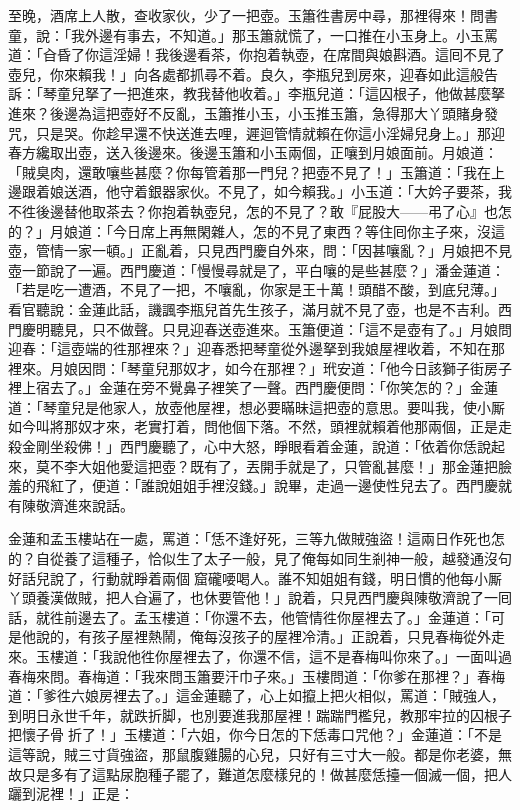 至晚，酒席上人散，查收家伙，少了一把壺。玉簫徃書房中尋，那裡得來！問書童，說：「我外邊有事去，不知道。」那玉簫就慌了，一口推在小玉身上。小玉罵道：「㒲昏了你這淫婦！我後邊看茶，你抱着執壺，在席間與娘斟酒。這囘不見了壺兒，你來賴我！」向各處都抓尋不着。良久，李瓶兒到房來，迎春如此這般告訴：「琴童兒拏了一把進來，教我替他收着。」李瓶兒道：「這囚根子，他做甚麼拏進來？後邊為這把壺好不反亂，玉簫推小玉，小玉推玉簫，急得那大丫頭賭身發咒，只是哭。你趁早還不快送進去哩，遲迴管情就賴在你這小淫婦兒身上。」那迎春方纔取出壺，送入後邊來。後邊玉簫和小玉兩個，正嚷到月娘面前。月娘道：「賊臭肉，還敢嚷些甚麼？你每管着那一門兒？把壺不見了！」玉簫道：「我在上邊跟着娘送酒，他守着銀器家伙。不見了，如今賴我。」小玉道：「大妗子要茶，我不徃後邊替他取茶去？你抱着執壺兒，怎的不見了？敢『屁股大——弔了心』也怎的？」月娘道：「今日席上再無閑雜人，怎的不見了東西？等住囘你主子來，沒這壺，管情一家一頓。」正亂着，只見西門慶自外來，問：「因甚嚷亂？」月娘把不見壺一節說了一遍。西門慶道：「慢慢尋就是了，平白嚷的是些甚麼？」潘金蓮道：「若是吃一遭酒，不見了一把，不嚷亂，你家是王十萬！頭醋不酸，到底兒薄。」{}看官聽說：金蓮此話，譏諷李瓶兒首先生孩子，滿月就不見了壺，也是不吉利。西門慶明聽見，只不做聲。只見迎春送壺進來。玉簫便道：「這不是壺有了。」月娘問迎春：「這壺端的徃那裡來？」迎春悉把琴童從外邊拏到我娘屋裡收着，不知在那裡來。月娘因問：「琴童兒那奴才，如今在那裡？」玳安道：「他今日該獅子街房子裡上宿去了。」金蓮在旁不覺鼻子裡笑了一聲。西門慶便問：「你笑怎的？」金蓮道：「琴童兒是他家人，放壺他屋裡，想必要瞞昧這把壺的意思。要叫我，使小厮如今叫將那奴才來，老實打着，問他個下落。不然，頭裡就賴着他那兩個，正是走殺金剛坐殺佛！」西門慶聽了，心中大怒，睜眼看着金蓮，{}說道：「依着你恁說起來，莫不李大姐他愛這把壺？既有了，丟開手就是了，只管亂甚麼！」那金蓮把臉羞的飛紅了，便道：「誰說姐姐手裡沒錢。」說畢，走過一邊使性兒去了。西門慶就有陳敬濟進來說話。

金蓮和孟玉樓站在一處，罵道：「恁不逢好死，三等九做賊強盜！這兩日作死也怎的？自從養了這種子，恰似生了太子一般，見了俺每如同生剎神一般，越發通沒句好話兒說了，行動就睜着兩個𣭈窟礲喓喝人。誰不知姐姐有錢，明日慣的他每小厮丫頭養漢做賊，把人㒲遍了，也休要管他！」說着，只見西門慶與陳敬濟說了一囘話，就徃前邊去了。孟玉樓道：「你還不去，他管情徃你屋裡去了。」金蓮道：「可是他說的，有孩子屋裡熱鬧，俺每沒孩子的屋裡冷清。」正說着，只見春梅從外走來。玉樓道：「我說他徃你屋裡去了，你還不信，這不是春梅叫你來了。」一面叫過春梅來問。春梅道：「我來問玉簫要汗巾子來。」{}玉樓問道：「你爹在那裡？」春梅道：「爹徃六娘房裡去了。」這金蓮聽了，心上如攛上把火相似，罵道：「賊強人，到明日永世千年，就跌折脚，也別要進我那屋裡！踹踹門檻兒，教那牢拉的囚根子把懷子骨𢱉折了！」玉樓道：「六姐，你今日怎的下恁毒口咒他？」金蓮道：「不是這等說，賊三寸貨強盜，那鼠腹雞腸的心兒，只好有三寸大一般。都是你老婆，無故只是多有了這點尿胞種子罷了，難道怎麼樣兒的！做甚麼恁擡一個滅一個，把人躧到泥裡！」正是：

